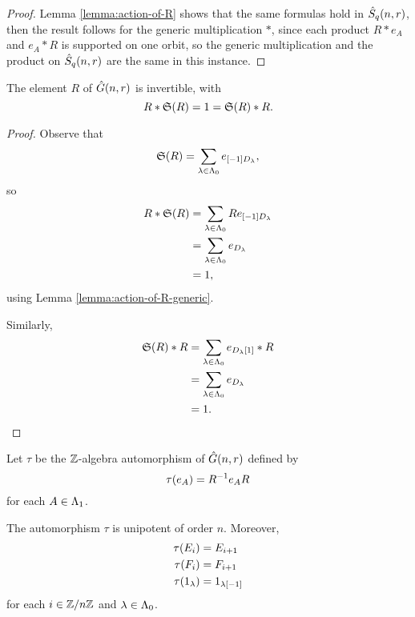 \documentclass[a4paper, 11pt, twoside]{report}
\begin{document}
\begin{proof}
Lemma \ref{lemma:action-of-R} shows that the same formulas hold in $\hat{S}_q(n,r)$, then the result follows for the generic multiplication $\ast$, since each product $R\ast e_A$ and $e_A \ast R$ is supported on one orbit, so the generic multiplication and the product on $\hat{S}_q(n,r)$ are the same in this instance.
\end{proof} 

\begin{lemma}\label{lemma:R-is-a-unit-generic}
The element $R$ of $\hat{G}(n,r)$ is invertible, with
\begin{equation*}
R \ast\mathfrak{S}{(R)} = 1 = \mathfrak{S}{(R)}\ast R.
\end{equation*}
\end{lemma}

\begin{proof}
Observe that
\begin{equation*}
\mathfrak{S}{(R)} = \sum_{\lambda\in\Lambda_0{}} e_{[-1]D_{\lambda}},
\end{equation*}
so
\begin{align*}
R\ast \mathfrak{S}{(R)} &= \sum_{\lambda\in\Lambda_0{}}R e_{[-1]D_{\lambda}}\\
&= \sum_{\lambda\in\Lambda_0{}} e_{D_{\lambda}}\\
&= 1,
\end{align*}
using Lemma \ref{lemma:action-of-R-generic}.

Similarly,
\begin{align*}
\mathfrak{S}{(R)}\ast R &= \sum_{\lambda\in\Lambda_0{}} e_{D_{\lambda} [1]}\ast R\\
&= \sum_{\lambda\in\Lambda_0{}} e_{D_{\lambda}}\\
&= 1.
\end{align*}
\end{proof}

Let $\tau$ be the $\mathbb{Z}$-algebra automorphism of $\hat{G}(n,r)$ defined by
\begin{equation*}
\tau{(e_A)}=R^{-1}e_A R
\end{equation*}
for each $A\in\Lambda_1{}$.

\begin{lemma}
The automorphism $\tau$ is unipotent of order $n$. Moreover,
\begin{align*}
\tau{(E_i)} &= E_{i+1}\\
\tau{(F_i)} &= F_{i+1}\\
\tau{(1_\lambda)} &= 1_{\lambda[-1]}
\end{align*}
for each $i\in\mathbb{Z}/{n \mathbb{Z}}$ and $\lambda\in\Lambda_0{}$.
\end{lemma}
\end{document}
